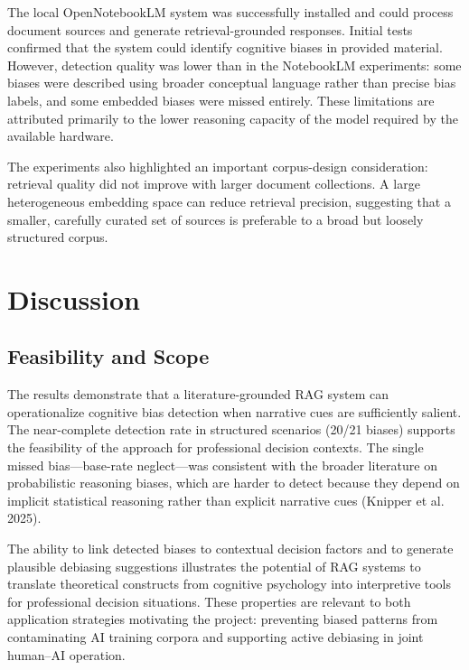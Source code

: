 \documentclass[
  letterpaper,
  DIV=11,
  numbers=noendperiod]{scrartcl}
\begin{document}
The local OpenNotebookLM system was successfully installed and could
process document sources and generate retrieval-grounded responses.
Initial tests confirmed that the system could identify cognitive biases
in provided material. However, detection quality was lower than in the
NotebookLM experiments: some biases were described using broader
conceptual language rather than precise bias labels, and some embedded
biases were missed entirely. These limitations are attributed primarily
to the lower reasoning capacity of the model required by the available
hardware.

The experiments also highlighted an important corpus-design
consideration: retrieval quality did not improve with larger document
collections. A large heterogeneous embedding space can reduce retrieval
precision, suggesting that a smaller, carefully curated set of sources
is preferable to a broad but loosely structured corpus.

\section{Discussion}\label{discussion}

\subsection{Feasibility and Scope}\label{feasibility-and-scope}

The results demonstrate that a literature-grounded RAG system can
operationalize cognitive bias detection when narrative cues are
sufficiently salient. The near-complete detection rate in structured
scenarios (20/21 biases) supports the feasibility of the approach for
professional decision contexts. The single missed bias---base-rate
neglect---was consistent with the broader literature on probabilistic
reasoning biases, which are harder to detect because they depend on
implicit statistical reasoning rather than explicit narrative cues
(Knipper et al. 2025).

The ability to link detected biases to contextual decision factors and
to generate plausible debiasing suggestions illustrates the potential of
RAG systems to translate theoretical constructs from cognitive
psychology into interpretive tools for professional decision situations.
These properties are relevant to both application strategies motivating
the project: preventing biased patterns from contaminating AI training
corpora and supporting active debiasing in joint human--AI operation.
\end{document}
